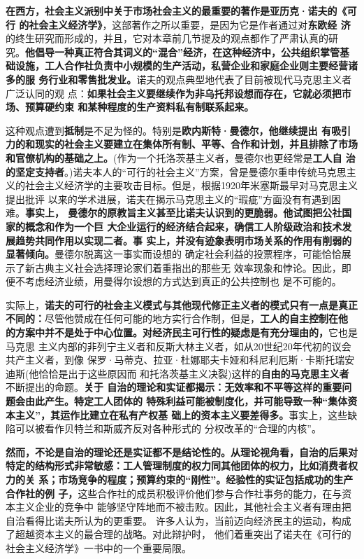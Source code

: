 \textbf{在西方，社会主义派别中关于市场社会主义的最重要的著作是亚历克·诺夫的《可行
  的社会主义经济学》}，这部著作之所以重要，是因为它是作者通过对\textbf{东欧经
  济}的终生研究而形成的，并且，它对本章前几节提及的观点都作了严肃认真的研
究。\textbf{他倡导一种真正符合其词义的“混合”经济，在这种经济中，公共组织掌管基
  础设施，工人合作社负责中小规模的生产活动，私营企业和家庭企业则主要经营诸多的服
  务行业和零售批发业。}诺夫的观点典型地代表了目前被现代马克思主义者广泛认同的观
点：\textbf{如果社会主义要继续作为非乌托邦设想而存在，它就必须把市场、预算硬约束
  和某种程度的生产资料私有制联系起来。}

这种观点遭到\textbf{抵制}是不足为怪的。特别是\textbf{欧内斯特·曼德尔，他继续提出
  有吸引力的和现实的社会主义要建立在集体所有制、平等、合作和计划，并且排除了市场
  和官僚机构的基础之上。}(作为一个托洛茨基主义者，曼德尔也更经常是\textbf{工人自
  治的坚定支持者}。)诺夫本人的“可行的社会主义”方案，曾是曼德尔重申传统马克思主
义的社会主义经济学的主要攻击目标。但是，根据1920年米塞斯最早对马克思主义提出批评
以来的学术进展，诺夫在揭示马克思主义的“瑕疵”方面没有有遇到困难。\textbf{事实上，
  曼德尔的原教旨主义甚至比诺夫认识到的更脆弱。他试图把公社国家的概念和作为一个巨
  大企业运行的经济结合起来，确信工人阶级政治和技术发展趋势共同作用以实现二者。事
  实上，并没有迹象表明市场关系的作用有削弱的显著倾向。}曼德尔脱离这一事实而设想的
确定社会利益的投票程序，可能恰恰展示了新古典主义社会选择理论家们着重指出的那些无
效率现象和悖论。因此，即便不考虑经济业绩，用曼得尔设想的方式达到真正的公共控制也
是不可能的。

实际上，\textbf{诺夫的可行的社会主义模式与其他现代修正主义者的模式只有一点是真正
  不同的：}尽管他赞成在任何可能的地方实行合作制，但是，\textbf{工人的自主控制在他
  的方案中并不是处于中心位置。对经济民主可行性的疑虑是有充分理由的，}它也是马克思
主义内部的非列宁主义者和反斯大林主义者，如从20世纪20年代初的议会共产主义者，到像
保罗·马蒂克、拉亚·杜娜耶夫卡娅和科尼利厄斯·卡斯托瑞安迪斯(他恰恰是出于这些原因而
和托洛茨基主义决裂)这样的\textbf{自由的马克思主义者}不断提出的命题。\textbf{关于
  自治的理论和实证都揭示：无效率和不平等这样的重要问题会由此产生。特定工人团体的
  特殊利益可能被制度化，并可能导致一种“集体资本主义”，其运作比建立在私有产权基
  础上的资本主义要差得多。}事实上，这些缺陷可以被看作贝特兰和斯威齐反对各种形式的
分权改革的“合理的内核”。

\textbf{然而，不论是自治的理论还是实证都不是结论性的。从理论视角看，自治的后果对
  特定的结构形式非常敏感：工人管理制度的权力同其他团体的权力，比如消费者权力的关
  系；市场竞争的程度；预算约束的“刚性”。经验性的实证包括成功的生产合作社的例
  子，}这些合作社的成员积极评价他们参与合作社事务的能力，在与资本主义企业的竞争中
能够坚守阵地而不被击败。因此，其他社会主义者有理由把自治看得比诺夫所认为的更重要。
许多人认为，当前迈向经济民主的运动，构成了超越资本主义的最合理的战略。对此辩护时，
他们着重突出了诺夫在《可行的社会主义经济学》一书中的一个重要局限。


